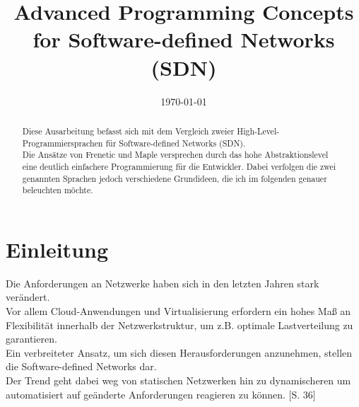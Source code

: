 \documentclass[10pt,conference]{IEEEtran}
\begin{document}
	
\title{Advanced Programming Concepts for Software-defined Networks (SDN)}
\author{
}
\date{\today}
\maketitle

\begin{abstract}
Diese Ausarbeitung befasst sich mit dem Vergleich zweier High-Level-Programmiersprachen für Software-defined Networks (SDN).\\
Die Ansätze von Frenetic \cite{2,3,4,6} und Maple \cite{7,10} versprechen durch das hohe Abstraktionslevel eine deutlich einfachere Programmierung für die Entwickler. Dabei verfolgen die zwei genannten Sprachen jedoch verschiedene Grundideen, die ich im folgenden genauer beleuchten möchte. 
\end{abstract}

\section{Einleitung}
Die Anforderungen an Netzwerke haben sich in den letzten Jahren stark verändert.\\
Vor allem Cloud-Anwendungen und Virtualisierung erfordern ein hohes Maß an Flexibilität innerhalb der Netzwerkstruktur, um z.B. optimale Lastverteilung zu garantieren.\\
Ein verbreiteter Ansatz, um sich diesen Herausforderungen anzunehmen, stellen die Software-defined Networks dar.\\ 
Der Trend geht dabei weg von statischen Netzwerken hin zu dynamischeren um automatisiert auf geänderte Anforderungen reagieren zu können. \cite{1}[S. 36]
\end{document}
